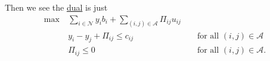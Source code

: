 \begin{explanation}
	Then we see the \hyperref[def:dual]{dual} is just
	\[
		\begin{alignedat}{3}
			\max~ & \sum\limits_{i\in\mathcal{N}}y_{i}b_{i}+\sum\limits_{(i, j)\in\mathcal{A}} \Pi_{ij}u_{ij}                                        \\
			& y_{i} - y_{j}+\Pi_{ij}\leq c_{ij}                                                         && \text{ for all }(i, j)\in\mathcal{A} \\
			& \Pi_{ij}\leq 0                                                                            && \text{ for all }(i, j)\in\mathcal{A}.
		\end{alignedat}
	\]
\end{explanation}